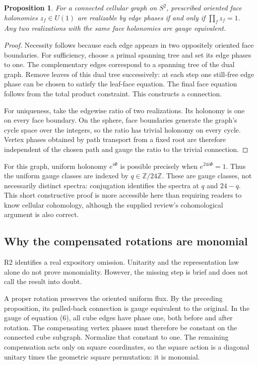 \documentclass[11pt,a4paper]{article}
\newtheorem{proposition}{Proposition}
\begin{document}
\begin{proposition}
For a connected cellular graph on $S^2$, prescribed oriented face holonomies $z_f\in U(1)$ are realizable by edge phases if and only if $\prod_f z_f=1$. Any two realizations with the same face holonomies are gauge equivalent.
\end{proposition}
\begin{proof}
Necessity follows because each edge appears in two oppositely oriented face boundaries. For sufficiency, choose a primal spanning tree and set its edge phases to one. The complementary edges correspond to a spanning tree of the dual graph. Remove leaves of this dual tree successively: at each step one still-free edge phase can be chosen to satisfy the leaf-face equation. The final face equation follows from the total product constraint. This constructs a connection.

For uniqueness, take the edgewise ratio of two realizations. Its holonomy is one on every face boundary. On the sphere, face boundaries generate the graph's cycle space over the integers, so the ratio has trivial holonomy on every cycle. Vertex phases obtained by path transport from a fixed root are therefore independent of the chosen path and gauge the ratio to the trivial connection.
\end{proof}
For this graph, uniform holonomy $e^{i\Phi}$ is possible precisely when $e^{24i\Phi}=1$. Thus the uniform gauge classes are indexed by $q\in\mathbb Z/24\mathbb Z$. These are gauge classes, not necessarily distinct spectra: conjugation identifies the spectra at $q$ and $24-q$. This short constructive proof is more accessible here than requiring readers to know cellular cohomology, although the supplied review's cohomological argument is also correct.

\subsection{Why the compensated rotations are monomial}
R2 identifies a real expository omission. Unitarity and the representation law alone do not prove monomiality. However, the missing step is brief and does not call the result into doubt.

A proper rotation preserves the oriented uniform flux. By the preceding proposition, its pulled-back connection is gauge equivalent to the original. In the gauge of equation (6), all cube edges have phase one, both before and after rotation. The compensating vertex phases must therefore be constant on the connected cube subgraph. Normalize that constant to one. The remaining compensation acts only on square coordinates, so the square action is a diagonal unitary times the geometric square permutation: it is monomial.
\end{document}
